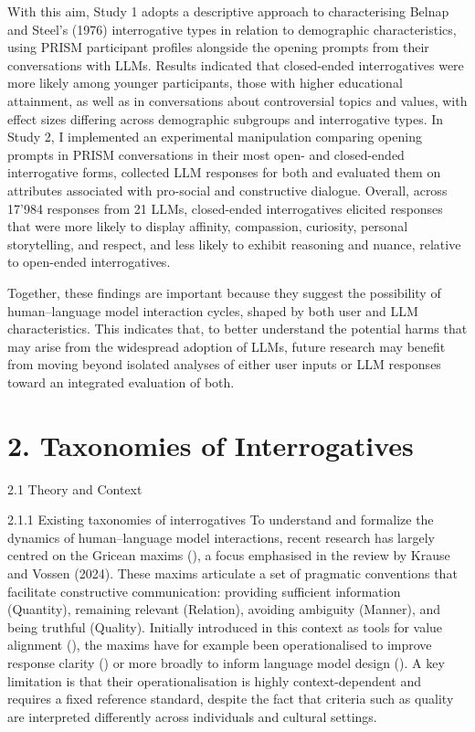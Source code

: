 \documentclass[
  12pt,
]{article}
\begin{document}
With this aim, Study 1 adopts a descriptive approach to characterising Belnap and Steel's (1976) interrogative types in relation to demographic characteristics, using PRISM participant profiles alongside the opening prompts from their conversations with LLMs. Results indicated that closed-ended interrogatives were more likely among younger participants, those with higher educational attainment, as well as in conversations about controversial topics and values, with effect sizes differing across demographic subgroups and interrogative types. In Study 2, I implemented an experimental manipulation comparing opening prompts in PRISM conversations in their most open- and closed-ended interrogative forms, collected LLM responses for both and evaluated them on attributes associated with pro-social and constructive dialogue. Overall, across 17'984 responses from 21 LLMs, closed-ended interrogatives elicited responses that were more likely to display affinity, compassion, curiosity, personal storytelling, and respect, and less likely to exhibit reasoning and nuance, relative to open-ended interrogatives.

Together, these findings are important because they suggest the possibility of human--language model interaction cycles, shaped by both user and LLM characteristics. This indicates that, to better understand the potential harms that may arise from the widespread adoption of LLMs, future research may benefit from moving beyond isolated analyses of either user inputs or LLM responses toward an integrated evaluation of both.

\section{2. Taxonomies of Interrogatives}\label{taxonomies-of-interrogatives}

2.1 Theory and Context

2.1.1 Existing taxonomies of interrogatives
To understand and formalize the dynamics of human--language model interactions, recent research has largely centred on the Gricean maxims (), a focus emphasised in the review by Krause and Vossen (2024). These maxims articulate a set of pragmatic conventions that facilitate constructive communication: providing sufficient information (Quantity), remaining relevant (Relation), avoiding ambiguity (Manner), and being truthful (Quality). Initially introduced in this context as tools for value alignment (), the maxims have for example been operationalised to improve response clarity () or more broadly to inform language model design (). A key limitation is that their operationalisation is highly context-dependent and requires a fixed reference standard, despite the fact that criteria such as quality are interpreted differently across individuals and cultural settings.
\end{document}
